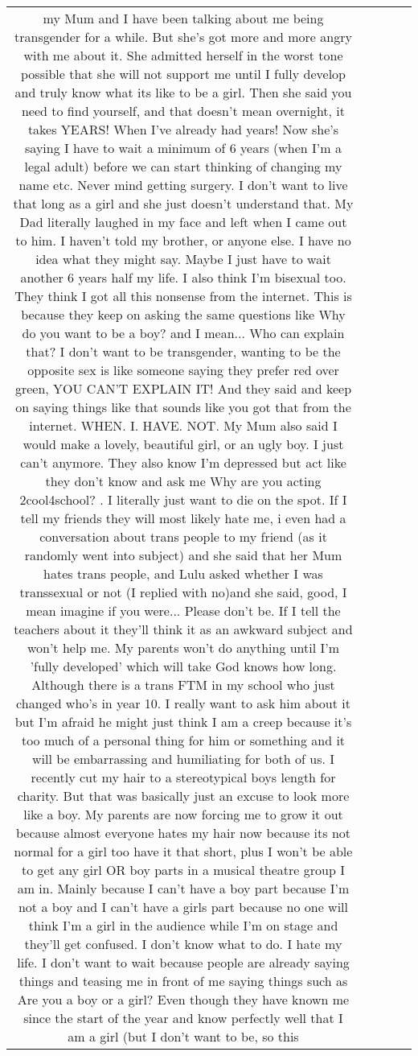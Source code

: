 \documentclass[11pt]{article}
\newlength\mylength
\begin{document}
\begin{center}
\begin{longtable}{|C{.40\mylength}|C{.30\mylength}|C{.15\mylength}|C{.15\mylength}|C{.15\mylength}|}
  my Mum and I have been talking about me being transgender for a while. But she's got more and more angry with me about it. She admitted herself in the worst tone possible that she will not support me until I  fully develop  and truly know what its like to be a girl. Then she said you need to find yourself, and that doesn't mean overnight, it takes YEARS! When I've already had years! Now she's saying I have to wait a minimum of 6 years (when I'm a legal adult) before we can start thinking of changing my name etc. Never mind getting surgery. I don't want to live that long as a girl and she just doesn't understand that. My Dad literally laughed in my face and left when I came out to him. I haven't told my brother, or anyone else. I have no idea what they might say. Maybe I just have to wait another 6 years  half my life. I also think I'm bisexual too. They think I got all this nonsense from the internet. This is because they keep on asking the same questions like  Why do you want to be a boy?  and I mean... Who can explain that? I don't want to be transgender, wanting to be the opposite sex is like someone saying they prefer red over green, YOU CAN'T EXPLAIN IT! And they said and keep on saying things like  that sounds like you got that from the internet. WHEN. I. HAVE. NOT. My Mum also said I would make a lovely, beautiful girl, or an ugly boy. I just can't anymore. They also know I'm depressed but act like they don't know and ask me   Why are you acting 2cool4school? . I literally just want to die on the spot. If I tell my friends they will most likely hate me, i even had a conversation about trans people to my friend (as it randomly went into subject) and she said that her Mum hates trans people, and Lulu asked whether I was transsexual or not (I replied with no)and she said,  good, I mean imagine if you were... Please don't be.  If I tell the teachers about it they'll think it as an awkward subject and won't help me. My parents won't do anything until I'm 'fully developed' which will take God knows how long. Although there is a trans FTM in my school who just changed who's in year 10. I really want to ask him about it but I'm afraid he might just think I am a creep because it's too much of a personal thing for him or something and it will be embarrassing and humiliating for both of us. I recently cut my hair to a stereotypical boys length for charity. But that was basically just an excuse to look more like a boy. My parents are now forcing me to grow it out because almost everyone hates my hair now because its not normal for a girl too have it that short, plus I won't be able to get any girl OR boy parts in a musical theatre group I am in. Mainly because I can't have a boy part because I'm not a  boy  and I can't have a girls part because no one will think I'm a girl in the audience while I'm on stage and they'll get confused. I don't know what to do. I hate my life. I don't want to wait because people are already saying things and teasing me in front of me saying things such as  Are you a boy or a girl?  Even though they have known me since the start of the year and know perfectly well that I am a girl (but I don't want to be, so this 
\end{longtable}
\end{center}
\end{document}
